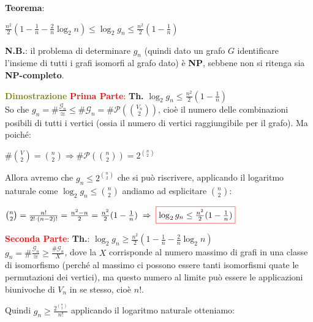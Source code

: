 \begin{flushleft}

    \textbf{Teorema}:

    {\centering
        $\frac{n^2}{2}(1 - \frac{1}{n} - \frac{2}{n} \log_2 n) \leq \log_2 g_n \leq \frac{n^2}{2} (1-\frac{1}{n})$
    \par}
    \textbf{N.B.}: il problema di determinare $g_n$ (quindi dato un grafo $G$ identificare l'insieme di tutti i grafi isomorfi al grafo dato) è \textbf{NP}, sebbene non si ritenga sia \textbf{NP-completo}.

    \begin{boxA}
        \textcolor{olive}{\textbf{Dimostrazione}} \newline
        \textcolor{red}{\textbf{Prima Parte}}: \textbf{Th.} $\log_2 g_n \leq \frac{n^2}{2}(1 - \frac{1}{n})$ \\
        So che $g_n = \# \frac{\mathcal{G}_n}{\cong} \leq \# \mathcal{G}_n = \# \mathcal{P}(\binom{V_n}{2})$, cioè il numero delle combinazioni posibili di tutti i vertici (ossia il numero di vertici raggiungibile per il grafo). Ma poiché: 
        
        {\centering
            $\# \binom{V}{2} = \binom{n}{2} \Rightarrow \# \mathcal{P}(\binom{n}{2}) = 2^{\binom{n}{2}}$
        \par}
        Allora avremo che $g_n \leq 2^{\binom{n}{2}}$ che si può riscrivere, applicando il logaritmo naturale come $\log_2 g_n \leq \binom{n}{2}$ andiamo ad esplicitare $\binom{n}{2}$:

        {\centering
            $\binom{n}{2} = \frac{n!}{2! \cdot (n-2)!} = \frac{n^2 - n}{2} = \frac{n^2}{2}(1 - \frac{1}{n}) \; \Rightarrow \; \fcolorbox{red}{white}{$\log_2 g_n \leq \frac{n^2}{2}(1 - \frac{1}{n})$}$
        \par}
        \textcolor{red}{\textbf{Seconda Parte}}: \textbf{Th.}: $\log_2 g_n \geq \frac{n^2}{2} (1 - \frac{1}{n} - \frac{2}{n} \log_2 n)$ \\
        $g_n = \# \frac{\mathcal{G}_n}{\cong} \geq \frac{\# \mathcal{G}_n}{X}$, dove la $X$ corrisponde al numero massimo di grafi in una classe di isomorfismo (perché al massimo ci possono essere tanti isomorfismi quate le permutazioni dei vertici), ma questo numero al limite può essere le applicazioni biunivoche di $V_n$ in se stesso, cioè $n!$. 
        
        Quindi $g_n \geq \frac{2^{\binom{n}{2}}}{n!}$ applicando il logaritmo naturale otteniamo:


\end{boxA}
\end{flushleft}
